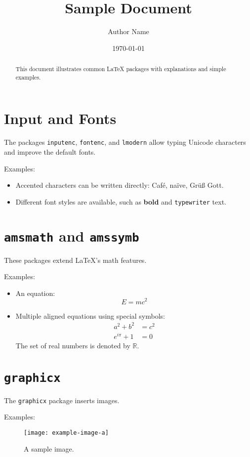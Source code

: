\documentclass[12pt]{article}
\title{Sample Document}
\author{Author Name}
\date{\today}
\begin{document}
\maketitle

\begin{abstract}
This document illustrates common LaTeX packages with explanations and simple
examples.
\end{abstract}

\section{Input and Fonts}\label{sec:fonts}
The packages \texttt{inputenc}, \texttt{fontenc}, and \texttt{lmodern} allow
typing Unicode characters and improve the default fonts.

Examples:
\begin{itemize}
  \item Accented characters can be written directly: Café, naïve, Grüß Gott.
  \item Different font styles are available, such as \textbf{bold} and
    \texttt{typewriter} text.
\end{itemize}

\section{\texttt{amsmath} and \texttt{amssymb}}\label{sec:math}
These packages extend LaTeX's math features.

Examples:
\begin{itemize}
  \item An equation:
    \begin{equation}
      E = mc^2
    \end{equation}
  \item Multiple aligned equations using special symbols:
    \begin{align}
      a^2 + b^2 &= c^2 \\
      e^{i\pi} + 1 &= 0
    \end{align}
    The set of real numbers is denoted by $\mathbb{R}$.
\end{itemize}

\section{\texttt{graphicx}}\label{sec:graphicx}
The \texttt{graphicx} package inserts images.

Examples:
\begin{figure}[h]
  \centering
  \texttt{[image: example-image-a]}
  \caption{A sample image.}
  \label{fig:image}
\end{figure}
\end{document}
